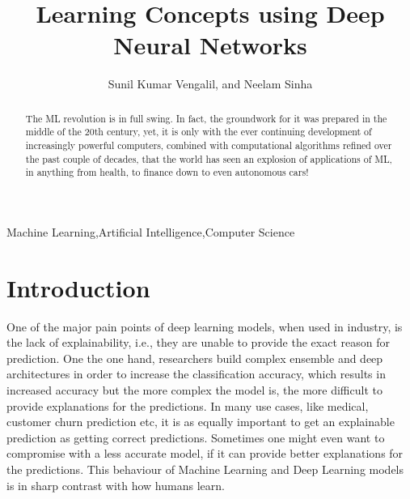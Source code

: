 \documentclass{JMLFS}
\begin{document}
\title{Learning Concepts using Deep Neural Networks}

\author{Sunil Kumar Vengalil, and Neelam Sinha}
\address{$^1$International Institute of Information Technology Bangalore}
\address{$^2$International Institute of Information Technology Bangalore}

\begin{abstract}
The ML revolution is in full swing. In fact, the groundwork for it was prepared in the middle of the 20th century, yet, it is only with the ever continuing development of increasingly powerful computers, combined with computational algorithms refined over the past couple of decades, that the world has seen an explosion of applications of ML, in anything from health, to finance down to even autonomous cars!
\end{abstract}

\maketitle

\begin{keyword}
Machine Learning\sep Artificial Intelligence\sep Computer Science
\end{keyword}

\section{Introduction}
One of the major pain points of deep learning models, when used in industry, is the lack of explainability, i.e., they are unable to provide the exact reason for prediction.
One the one hand, researchers build complex ensemble and deep architectures in order to increase the classification accuracy, which results in increased accuracy but the more complex the model is, the more difficult to provide explanations for the predictions.
In many use cases, like medical, customer churn prediction etc, it is as equally important to get an explainable prediction as getting correct predictions.
Sometimes one might even want to compromise with a less accurate model, if it can provide better explanations for the predictions.
This behaviour of Machine Learning and Deep Learning models is in sharp contrast with how humans learn.
\end{document}
